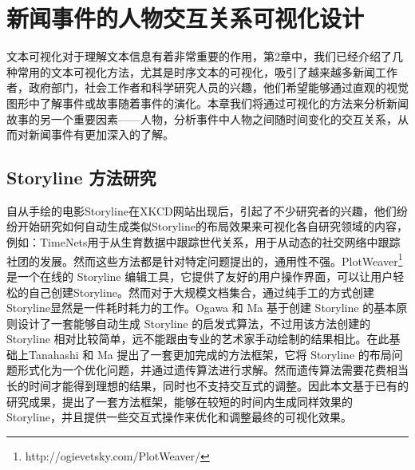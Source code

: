 \chapter{新闻事件的人物交互关系可视化设计}
文本可视化对于理解文本信息有着非常重要的作用，第2章中，我们已经介绍了几种常用的文本可视化方法，尤其是时序文本的可视化，吸引了越来越多新闻工作者，政府部门，社会工作者和科学研究人员的兴趣，他们希望能够通过直观的视觉图形中了解事件或故事随着事件的演化。本章我们将通过可视化的方法来分析新闻故事的另一个重要因素——人物，分析事件中人物之间随时间变化的交互关系，从而对新闻事件有更加深入的了解。
\section{Storyline 方法研究}
自从手绘的电影Storyline在XKCD网站出现后，引起了不少研究者的兴趣，他们纷纷开始研究如何自动生成类似Storyline的布局效果来可视化各自研究领域的内容，例如：TimeNets\cite{Kim:2010:TGD}用于从生育数据中跟踪世代关系，\cite{Reda2011}用于从动态的社交网络中跟踪社团的发展。然而这些方法都是针对特定问题提出的，通用性不强。PlotWeaver\footnote{http://ogievetsky.com/PlotWeaver/} 是一个在线的 Storyline 编辑工具，它提供了友好的用户操作界面，可以让用户轻松的自己创建Storyline。然而对于大规模文档集合，通过纯手工的方式创建Storyline显然是一件耗时耗力的工作。Ogawa 和 Ma \cite{Ogawa:2010} 基于创建 Storyline 的基本原则设计了一套能够自动生成 Storyline 的启发式算法，不过用该方法创建的 Storyline 相对比较简单，远不能跟由专业的艺术家手动绘制的结果相比。在此基础上Tanahashi 和 Ma\cite{tanahashi2012design} 提出了一套更加完成的方法框架，它将 Storyline 的布局问题形式化为一个优化问题，并通过遗传算法进行求解。然而遗传算法需要花费相当长的时间才能得到理想的结果，同时也不支持交互式的调整。因此本文基于已有的研究成果，提出了一套方法框架，能够在较短的时间内生成同样效果的 Storyline，并且提供一些交互式操作来优化和调整最终的可视化效果。

